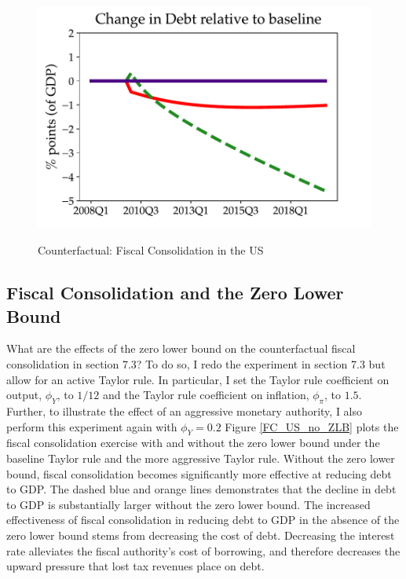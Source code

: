 \begin{figure}[t!]
\begin{minipage}{0.51\textwidth}
\label{fig:c}
\end{minipage}\hspace*{\fill}
\begin{minipage}{0.51\textwidth}
\includegraphics[scale=.57]{text/chapter1/Figures/Fiscal_Consolidation_CounterFactual/change_in_debt_CounterFactual_Fiscal_Consolidation}
 \label{fig:d}
\end{minipage}

\caption{Counterfactual: Fiscal Consolidation in the US}

\label{FC_US}
\end{figure}


\hypertarget{Fiscal Consolidation and the Zero Lower Bound}{}
\subsection{Fiscal Consolidation and the Zero Lower Bound}

What are the effects of the zero lower bound on the counterfactual fiscal consolidation in section 7.3? To do so, I redo the experiment in section 7.3 but allow for an active Taylor rule. In particular, I set the Taylor rule coefficient on output, $\phi_{Y}$, to $1/12$ and the Taylor rule coefficient on inflation, $\phi_{\pi}$, to $1.5$.  Further, to illustrate the effect of an aggressive monetary authority, I also perform this experiment again with $\phi_{Y} = 0.2$ Figure \ref{FC_US_no_ZLB} plots the fiscal consolidation exercise with and without the zero lower bound under the baseline Taylor rule and the more aggressive Taylor rule. Without the zero lower bound, fiscal consolidation becomes significantly more effective at reducing debt to GDP. The dashed blue and orange lines demonstrates that the decline in debt to GDP is substantially larger without the zero lower bound. The increased effectiveness of fiscal consolidation in reducing debt to GDP in the absence of the zero lower bound stems from decreasing the cost of debt. Decreasing the interest rate alleviates the fiscal authority's cost of borrowing, and therefore decreases the upward pressure that lost tax revenues place on debt. 


